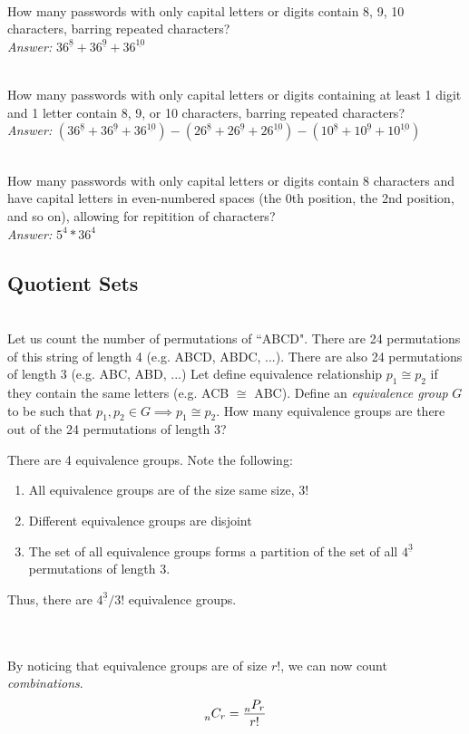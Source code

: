 \begin{problem}[Problem 1]\\
How many passwords with only capital letters or digits contain 8, 9, 10 characters, barring repeated characters?
\\ \emph{Answer:} $36^{\underline{8}}+36^{\underline{9}}+36^{\underline{10}}$
\end{problem}
\begin{problem}[Problem 2]\\
How many passwords with only capital letters or digits containing at least 1 digit and 1 letter contain 8, 9, or 10 characters, barring repeated characters?
\\ \emph{Answer:} $(36^{\underline{8}}+36^{\underline{9}}+36^{\underline{10}}) - (26^{\underline{8}}+26^{\underline{9}}+26^{\underline{10}}) - (10^{\underline{8}}+10^{\underline{9}}+10^{\underline{10}})$
\end{problem}
\begin{problem}[Problem 3]\\
How many passwords with only capital letters or digits contain 8 characters and have capital letters in even-numbered spaces (the 0th position, the 2nd position, and so on), allowing for repitition of characters? \\
\emph{Answer:} $5^4 * 36^4$
\end{problem}

\subsection{Quotient Sets}
\begin{problem}\\
Let us count the number of permutations of ``ABCD". There are 24 permutations of this string of length 4 (e.g. ABCD, ABDC, ...). There are also 24 permutations of length 3 (e.g. ABC, ABD, ...) Let define equivalence relationship $p_1 \cong p_2$ if they contain the same letters (e.g. ACB $\cong$ ABC). Define an \emph{equivalence group} $G$ to be such that $p_1, p_2 \in G \implies p_1 \cong p_2$.
How many equivalence groups are there out of the 24 permutations of length 3?
\end{problem}
\begin{solution}
There are 4 equivalence groups. Note the following:
\begin{enumerate}
    \item All equivalence groups are of the size same size, 3!
    \item Different equivalence groups are disjoint
    \item The set of all equivalence groups forms a partition of the set of all $4^{\underline{3}}$ permutations of length 3.
\end{enumerate}
Thus, there are $4^{\underline{3}}/3!$ equivalence groups.
\end{solution} \\ \\
By noticing that equivalence groups are of size $r!$, we can now count \emph{combinations}.
\[
\prescript{}{n}{C_r} = \frac{\prescript{}{n}{P_r}}{r!}
\]
% 